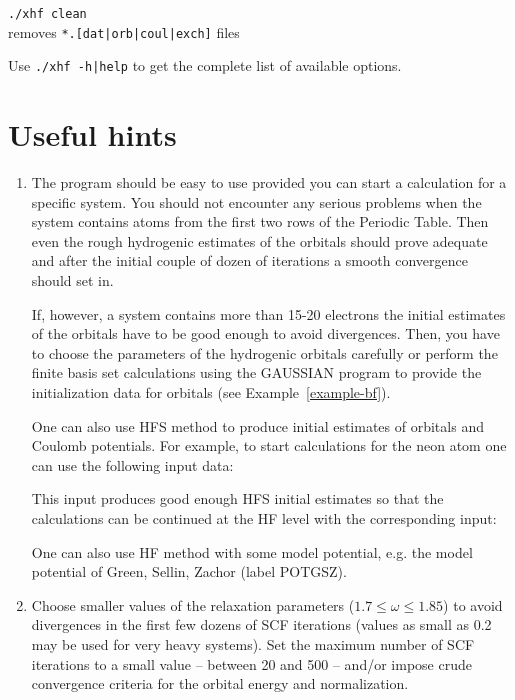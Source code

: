 \documentclass[12pt,a4paper]{article}
\newcommand{\ft}[1]{\texttt{#1}}
\begin{document}
\begin{description}
\item \hspace*{0.5cm} \texttt{./xhf clean} \\ removes
  \texttt{*.[dat|orb|coul|exch]} files
\end{description}

Use \ft{./xhf -h|help} to get the complete list of available options.

\section{Useful hints}

\begin{enumerate}
\item The program should be easy to use provided you can start a
  calculation for a specific system. You should not encounter any
  serious problems when the system contains atoms from the first two
  rows of the Periodic Table. Then even the rough hydrogenic estimates
  of the orbitals should prove adequate and after the initial couple
  of dozen of iterations a smooth convergence should set in.

  If, however, a system contains more than 15-20 electrons the initial
  estimates of the orbitals have to be good enough to avoid
  divergences. Then, you have to choose the parameters of the
  hydrogenic orbitals carefully or perform the finite basis set
  calculations using the GAUSSIAN program to provide the
  initialization data for orbitals (see Example~\ref{example-bf}).

  One can also use HFS method to produce initial estimates of orbitals
  and Coulomb potentials. For example, to start calculations for the
  neon atom one can use the following input data:

  

  This input produces good enough HFS initial estimates so that the
  calculations can be continued at the HF level with the corresponding
  input:

  

  One can also use HF method with some model potential, e.g. the model
  potential of Green, Sellin, Zachor (label POTGSZ).

\item Choose smaller values of the relaxation parameters ($1.7\leq
  \omega\leq 1.85$) to avoid divergences in the first few dozens of
  SCF iterations (values as small as 0.2 may be used for very heavy
  systems). Set the maximum number of SCF iterations to a small value
  -- between 20 and 500 -- and/or impose crude convergence criteria
  for the orbital energy and normalization.


\end{enumerate}
\end{document}
